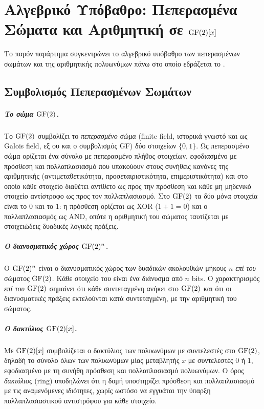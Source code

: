 \chapter{Αλγεβρικό Υπόβαθρο: Πεπερασμένα Σώματα και Αριθμητική σε \texorpdfstring{$\mathrm{GF}(2)[x]$}{GF(2)[x]}}
\label{app:finite-fields}

Το παρόν παράρτημα συγκεντρώνει το αλγεβρικό υπόβαθρο των πεπερασμένων σωμάτων και της αριθμητικής πολυωνύμων πάνω στο οποίο εδράζεται το \HQC.

\section{Συμβολισμός Πεπερασμένων Σωμάτων}
\label{sec:appendix-field-notation}

\paragraph{Το σώμα $\mathrm{GF}(2)$.}
Το $\mathrm{GF}(2)$ συμβολίζει το \emph{πεπερασμένο σώμα} (finite field, ιστορικά γνωστό και ως Galois field, εξ ου και ο συμβολισμός GF) δύο στοιχείων $\{0,1\}$.
Ως πεπερασμένο σώμα ορίζεται ένα σύνολο με πεπερασμένο πλήθος στοιχείων, εφοδιασμένο με πρόσθεση και πολλαπλασιασμό που υπακούουν στους συνήθεις κανόνες της αριθμητικής (αντιμεταθετικότητα, προσεταιριστικότητα, επιμεριστικότητα) και στο οποίο κάθε στοιχείο διαθέτει αντίθετο ως προς την πρόσθεση και κάθε μη μηδενικό στοιχείο αντίστροφο ως προς τον πολλαπλασιασμό.
Στο $\mathrm{GF}(2)$ τα δύο μόνα στοιχεία είναι το $0$ και το $1$: η πρόσθεση ορίζεται ως XOR ($1{+}1{=}0$) και ο πολλαπλασιασμός ως AND, οπότε η αριθμητική του σώματος ταυτίζεται με στοιχειώδεις δυαδικές λογικές πράξεις.

\paragraph{Ο διανυσματικός χώρος $\mathrm{GF}(2)^n$.}
Ο $\mathrm{GF}(2)^n$ είναι ο διανυσματικός χώρος των δυαδικών ακολουθιών μήκους $n$ \emph{επί του} σώματος $\mathrm{GF}(2)$. Κάθε στοιχείο του είναι ένα διάνυσμα από $n$ bits. Ο χαρακτηρισμός \emph{επί του} $\mathrm{GF}(2)$ σημαίνει ότι κάθε συντεταγμένη ανήκει στο $\mathrm{GF}(2)$ και ότι οι διανυσματικές πράξεις εκτελούνται κατά συντεταγμένη, με την αριθμητική του σώματος.

\paragraph{Ο δακτύλιος $\mathrm{GF}(2)[x]$.}
Με $\mathrm{GF}(2)[x]$ συμβολίζεται ο δακτύλιος των πολυωνύμων με συντελεστές στο $\mathrm{GF}(2)$, δηλαδή το σύνολο όλων των πολυωνύμων μίας μεταβλητής $x$ με συντελεστές $0$ ή $1$, εφοδιασμένο με τη συνήθη πρόσθεση και πολλαπλασιασμό πολυωνύμων. Ο όρος \emph{δακτύλιος} (ring) υποδηλώνει ότι η δομή υποστηρίζει πρόσθεση και πολλαπλασιασμό με τις αναμενόμενες ιδιότητες, χωρίς ωστόσο να εγγυάται την ύπαρξη πολλαπλασιαστικού αντιστρόφου για κάθε στοιχείο.

